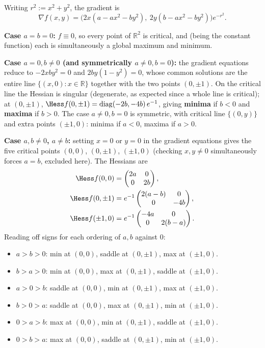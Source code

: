 \begin{exercisesolution}
Writing $r^2 := x^2+y^2$, the gradient is
\[\nabla f(x,y) = \big(2x(a-ax^2-by^2),\ 2y(b-ax^2-by^2)\big)e^{-r^2}.\]

\textbf{Case $a=b=0$:} $f \equiv 0$, so every point of $\mathbb{R}^2$ is critical, and (being the
constant function) each is simultaneously a global maximum and minimum.

\textbf{Case $a=0, b\neq 0$ (and symmetrically $a \neq 0, b=0$):} the gradient equations reduce to
$-2xby^2=0$ and $2by(1-y^2)=0$, whose common solutions are the entire line $\{(x,0): x\in
\mathbb{R}\}$ together with the two points $(0,\pm1)$. On the critical line the Hessian is
singular (degenerate, as expected since a whole line is critical); at $(0,\pm1)$,
$\Hess f(0,\pm1) = \operatorname{diag}(-2b,-4b)\,e^{-1}$, giving \textbf{minima} if $b<0$ and
\textbf{maxima} if $b>0$. The case $a\neq0,b=0$ is symmetric, with critical line $\{(0,y)\}$ and
extra points $(\pm1,0)$: minima if $a<0$, maxima if $a>0$.

\textbf{Case $a,b \neq 0$, $a \neq b$:} setting $x=0$ or $y=0$ in the gradient equations gives the
five critical points $(0,0)$, $(0,\pm1)$, $(\pm1,0)$ (checking $x,y\neq0$ simultaneously forces
$a=b$, excluded here). The Hessians are
\begin{align*}
\Hess f(0,0) &= \begin{pmatrix}2a&0\\0&2b\end{pmatrix}, \\
\Hess f(0,\pm1) &= e^{-1}\begin{pmatrix}2(a-b)&0\\0&-4b\end{pmatrix}, \\
\Hess f(\pm1,0) &= e^{-1}\begin{pmatrix}-4a&0\\0&2(b-a)\end{pmatrix}.
\end{align*}
Reading off signs for each ordering of $a,b$ against $0$:
\begin{itemize}
  \item $a>b>0$: min at $(0,0)$, saddle at $(0,\pm1)$, max at $(\pm1,0)$.
  \item $b>a>0$: min at $(0,0)$, max at $(0,\pm1)$, saddle at $(\pm1,0)$.
  \item $a>0>b$: saddle at $(0,0)$, min at $(0,\pm1)$, max at $(\pm1,0)$.
  \item $b>0>a$: saddle at $(0,0)$, max at $(0,\pm1)$, min at $(\pm1,0)$.
  \item $0>a>b$: max at $(0,0)$, min at $(0,\pm1)$, saddle at $(\pm1,0)$.
  \item $0>b>a$: max at $(0,0)$, saddle at $(0,\pm1)$, min at $(\pm1,0)$.
\end{itemize}


\end{exercisesolution}
